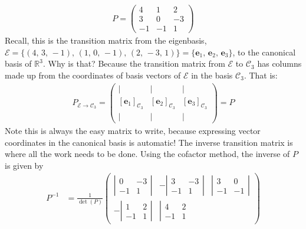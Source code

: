 {\begin{align*}
P = 
 \begin{pmatrix}
  4 &  1 &  2 \\
  3 &  0 & -3 \\
 -1 & -1 &  1
 \end{pmatrix}
\end{align*}
Recall, this is the transition matrix from the eigenbasis, $\mathcal{E} = \{(4,\,3,\,-1),\, (1,\,0,\,-1),\, (2,\,-3,\,1) \} = \{\mathbf{e}_1,\, \mathbf{e}_2,\, \mathbf{e}_3 \}$, to the canonical basis of $\mathbb{R}^3$. Why is that? Because the transition matrix from $\mathcal{E}$ to $\mathcal{C}_3$ has columns made up from the coordinates of basis vectors of $\mathcal{E}$ in the basis $\mathcal{C}_3$. That is:
\begin{align*}
P_{\mathcal{E}\to\mathcal{C}_3} = 
 \begin{pmatrix}
  | &  | &  | \\
  [\mathbf{e}_1]_{\mathcal{C}_3} & [\mathbf{e}_2]_{\mathcal{C}_3} & [\mathbf{e}_3]_{\mathcal{C}_3} \\
  | &  | &  |
 \end{pmatrix}
 =P
\end{align*}
Note this is always the easy matrix to write, because expressing vector coordinates in the canonical basis is automatic! The inverse transition matrix is where all the work needs to be done. Using the cofactor method, the inverse of $P$ is given by
\begin{align*}
P^{-1} &=
\frac{1}{\det(P)} 
 \begin{pmatrix}
 	\left|\begin{matrix}
  		 0 &  -3 \\
  	    -1 &   1
 	\end{matrix}\right|
  &
 	-\left|\begin{matrix}
  		 3 &  -3 \\
  	    -1 &   1
 	\end{matrix}\right|
  & 
 	\left|\begin{matrix}
  		 3 &   0 \\
  	    -1 &  -1
 	\end{matrix}\right|
  \\
 	-\left|\begin{matrix}
  		 1 &   2 \\
  	    -1 &   1
 	\end{matrix}\right|
  &
 	\left|\begin{matrix}
  		 4 &   2 \\
  	    -1 &   1

\end{matrix}
\end{pmatrix}
\end{align*}}
